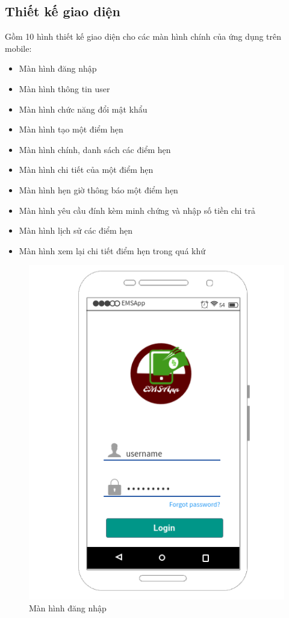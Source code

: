 \documentclass[a4paper]{article}
\begin{document}
\subsection{Thiết kế giao diện}
Gồm 10 hình thiết kế giao diện cho các màn hình chính  của ứng dụng trên mobile:
\begin{itemize}
    \item Màn hình đăng nhập
    \item Màn hình thông tin user
    \item Màn hình chức năng đổi mật khẩu
    \item Màn hình tạo một điểm hẹn
    \item Màn hình chính, danh sách các điểm hẹn
    \item Màn hình chi tiết của một điểm hẹn
    \item Màn hình hẹn giờ thông báo một điểm hẹn
    \item Màn hình yêu cầu đính kèm minh chứng và nhập số tiền chi trả
    \item Màn hình lịch sử các điểm hẹn    
    \item Màn hình xem lại chi tiết điểm hẹn trong quá khứ
\end{itemize}
\begin{figure}[h]
    \includegraphics[scale=1]{Mockup/Login}
    \centering
    \caption{Màn hình đăng nhập}
    \label{fig:login}
\end{figure}
\end{document}
